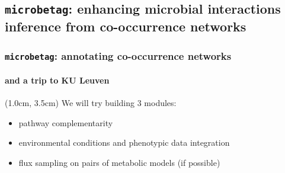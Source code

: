 \documentclass{beamer}
\begin{document}
   \begin{darkframes}
      \section{
         \texttt{microbetag}: enhancing microbial interactions inference from co-occurrence networks
      }
   \end{darkframes}

   \begin{frame}

      \frametitle{
         \texttt{microbetag}: annotating co-occurrence networks
      }
      \framesubtitle{and a trip to KU Leuven}

      \begin{textblock*}{5cm}(1.0cm, 3.5cm)
         We will try building 3 modules: 
         
         \begin{itemize}
            \small \item pathway complementarity
            \small \item environmental conditions and phenotypic data integration
            \small \item flux sampling on pairs of metabolic models (if possible)
         \end{itemize}

      \end{textblock*}



\end{frame}
\end{document}

